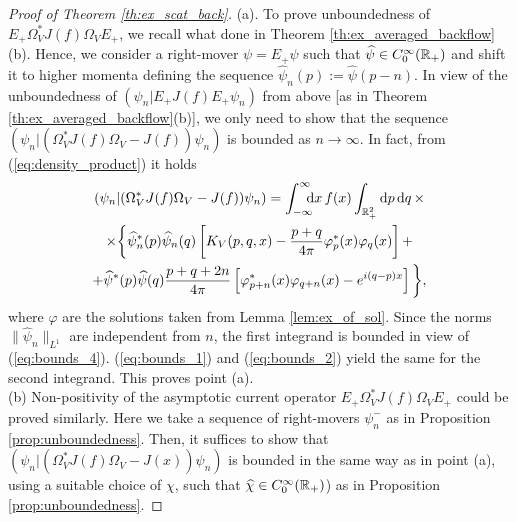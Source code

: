 \begin{proof}[Proof of Theorem \ref{th:ex_scat_back}]
	(a). To prove unboundedness of $E_+\Omega_V^*J(f)\Omega_VE_+$, we recall what done in Theorem \ref{th:ex_averaged_backflow} (b). Hence, we consider a right-mover $\psi=E_+\psi$ such that $\widehat{\psi}\in C^\infty_0({\mathbb R}_+)$ and shift it to higher momenta defining the sequence $\hat{\psi}_n(p):=\hat{\psi}(p-n)$. In view of the unboundedness of $(\psi_n|E_+J(f)E_+\psi_n)$ from above [as in Theorem \ref{th:ex_averaged_backflow}(b)], we only need to show that the sequence $(\psi_n|(\Omega_V^*J(f)\Omega_V-J(f))\psi_n)$ is bounded as $n\to\infty$. In fact, from (\ref{eq:density_product}) it holds
	\begin{multline}
		(\psi_n|(\Omega_V^*J(f)\Omega_V-J(f))\psi_n)=\int_{-\infty}^{\infty}\!\!\!\! \mathrm d x\, f(x)\int_{{\mathbb R}_+^2}\mathrm d p\,\mathrm d q\,\times\\
		 \times\bigg\{\widehat{\psi}^*_n(p)\widehat{\psi}_n(q)\left[K_V(p,q,x)-\frac{p+q}{4\pi}\varphi_p^*(x)\varphi_q(x)\right]+\\
		 +\widehat{\psi}^*(p)\widehat{\psi}(q)\frac{p+q+2n}{4\pi}\left[\varphi_{p+n}^*(x)\varphi_{q+n}(x)-e^{i(q-p)x}\right]\bigg\},
	\end{multline}
	where $\varphi$ are the solutions taken from Lemma \ref{lem:ex_of_sol}. Since the norms $\|\hat{\psi}_n\|_{L^1}$ are independent from $n$, the first integrand is bounded in view of (\ref{eq:bounds_4}). (\ref{eq:bounds_1}) and (\ref{eq:bounds_2}) yield the same for the second integrand. This proves point (a).\\
	(b) Non-positivity of the asymptotic current operator $E_+\Omega_V^*J(f)\Omega_VE_+$ could be proved similarly. Here we take a sequence of right-movers $\psi_n^-$  as in Proposition \ref{prop:unboundedness}. Then, it suffices to show that $(\psi_n|(\Omega_V^*J(f)\Omega_V-J(x))\psi_n)$ is bounded in the same way as in point (a), using a suitable choice of $\chi$, such that $\widehat{\chi}\in C^\infty_0({\mathbb R}_+)$) as in Proposition \ref{prop:unboundedness}.
\end{proof}

